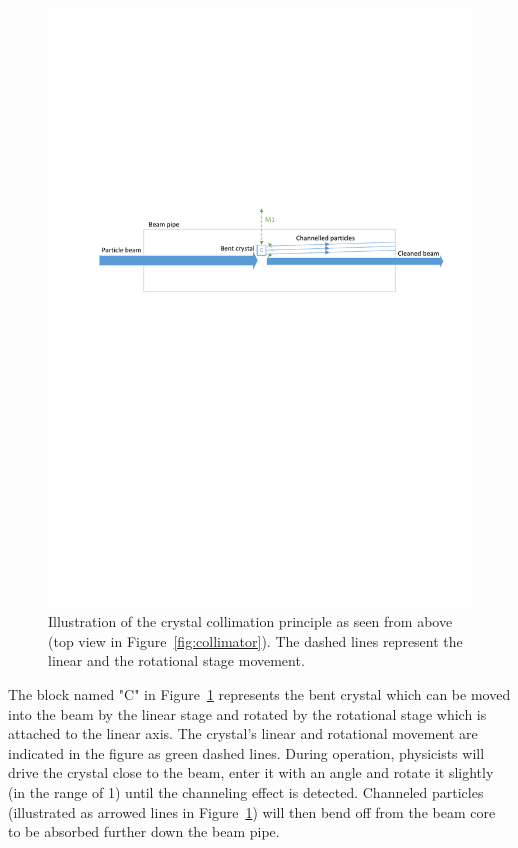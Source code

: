 \begin{figure}[h!]
  \centering %
  \includegraphics[width=1\textwidth, trim= 2cm 15.5cm 1cm 10cm, clip=true]{fig/matlab/collimation}
  \caption{\label{fig:collimation}Illustration of the crystal collimation principle as seen from above (top view in Figure~\ref{fig:collimator}). The dashed lines represent the linear and the rotational stage movement.}
\end{figure}

The block named "C" in Figure~\ref{fig:collimation} represents the bent crystal which can be moved into the beam by the linear stage and rotated by the rotational stage which is attached to the linear axis. The crystal's linear and rotational movement are indicated in the figure as green dashed lines. During operation, physicists will drive the crystal close to the beam, enter it with an angle and rotate it slightly (in the range of \unit{1}{\milli\rad}) until the channeling effect is detected. Channeled particles (illustrated as arrowed lines in Figure~\ref{fig:collimation}) will then bend off from the beam core to be absorbed further down the beam pipe.

